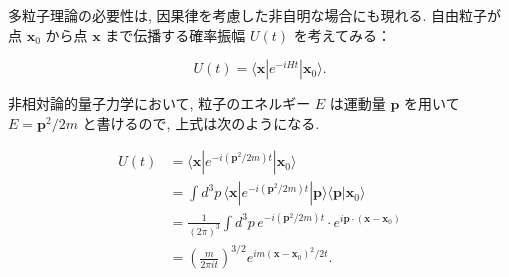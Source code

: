 \documentclass[a4paper,12pt]{article}
\begin{document}
多粒子理論の必要性は, 因果律を考慮した非自明な場合にも現れる. 自由粒子が点 $\boldsymbol{x}_0$ から点 $\boldsymbol{x}$ まで伝播する確率振幅 $U(t)$ を考えてみる：

\begin{equation*}
  U(t) = \langle \boldsymbol{x} | e^{-iHt} | \boldsymbol{x}_0 \rangle.
\end{equation*}
  
非相対論的量子力学において, 粒子のエネルギー $E$ は運動量 $\boldsymbol{p}$ を用いて $E = \boldsymbol{p}^2 / 2m$ と書けるので, 上式は次のようになる.
  
\begin{align*}
  U(t) &= \langle \boldsymbol{x} | e^{-i(\boldsymbol{p}^2 / 2m)t} | \boldsymbol{x}_0 \rangle \\
  &= \int d^3 p \, \langle \boldsymbol{x} | e^{-i(\boldsymbol{p}^2 / 2m)t} | \boldsymbol{p} \rangle \langle \boldsymbol{p} | \boldsymbol{x}_0 \rangle \\
  &= \frac{1}{(2\pi)^3} \int d^3p \, e^{-i(\boldsymbol{p}^2 / 2m)t} \cdot e^{i\boldsymbol{p} \cdot (\boldsymbol{x} - \boldsymbol{x}_0)} \\
  &= \left( \frac{m}{2\pi i t} \right)^{3/2} e^{im(\boldsymbol{x} - \boldsymbol{x}_0)^2 / 2t}.
\end{align*}
  
\end{document}
